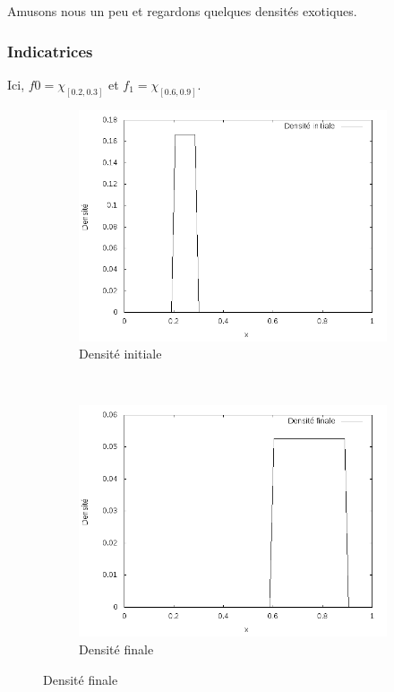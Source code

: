 \documentclass[a4paper,12pt]{article}
\begin{document}
\newpage


Amusons nous un peu et regardons quelques densités exotiques. 
\subsubsection{Indicatrices}
Ici, $f0= \chi_{[0.2,0.3]}$ et $f_1=\chi_{[0.6,0.9]}$.
\begin{figure}[!h]
\centering 
	\begin{subfigure}[b]{0.48\linewidth}
	\includegraphics[width=\textwidth]{img/1DIndicatrix/f0.png}
	\caption{Densité initiale}
	\end{subfigure}
	~
	\begin{subfigure}[b]{0.48\linewidth}
	\includegraphics[width=\textwidth]{img/1DIndicatrix/f1.png}
	\caption{Densité finale}
	\end{subfigure}
	

\end{figure}
\end{document}
